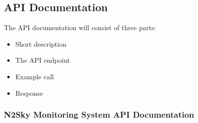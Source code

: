 \subsection{API Documentation}\label{API Documentation}

The API documentation will consist of three parts:
\begin{itemize}
\item Short description
\item The API endpoint
\item Example call
\item Response
\end{itemize}

\subsubsection{N2Sky Monitoring System API Documentation}\label{N2Sky Monitoring System API Documentation}

